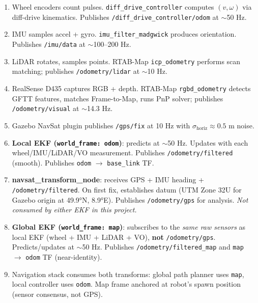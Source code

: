 \documentclass[11pt,a4paper]{article}
\begin{document}
\begin{enumerate}
\item Wheel encoders count pulses. \texttt{diff\_drive\_controller} computes $(v, \omega)$ via diff-drive kinematics. Publishes \texttt{/diff\_drive\_controller/odom} at $\sim$50 Hz.

\item IMU samples accel + gyro. \texttt{imu\_filter\_madgwick} produces orientation. Publishes \texttt{/imu/data} at $\sim$100--200 Hz.

\item LiDAR rotates, samples points. RTAB-Map \texttt{icp\_odometry} performs scan matching; publishes \texttt{/odometry/lidar} at $\sim$10 Hz.

\item RealSense D435 captures RGB + depth. RTAB-Map \texttt{rgbd\_odometry} detects GFTT features, matches Frame-to-Map, runs PnP solver; publishes \texttt{/odometry/visual} at $\sim$14.3 Hz.

\item Gazebo NavSat plugin publishes \texttt{/gps/fix} at 10 Hz with $\sigma_{\text{horiz}} \approx 0.5$ m noise.

\item \textbf{Local EKF (\texttt{world\_frame: odom})}: predicts at $\sim$50 Hz. Updates with each wheel/IMU/LiDAR/VO measurement. Publishes \texttt{/odometry/filtered} (smooth). Publishes \texttt{odom} $\to$ \texttt{base\_link} TF.

\item \textbf{navsat\_transform\_node}: receives GPS + IMU heading + \texttt{/odometry/filtered}. On first fix, establishes datum (UTM Zone 32U for Gazebo origin at 49.9°N, 8.9°E). Publishes \texttt{/odometry/gps} for analysis. \emph{Not consumed by either EKF in this project.}

\item \textbf{Global EKF (\texttt{world\_frame: map})}: subscribes to the \emph{same raw sensors} as local EKF (wheel + IMU + LiDAR + VO), \textbf{not} \texttt{/odometry/gps}. Predicts/updates at $\sim$50 Hz. Publishes \texttt{/odometry/filtered\_map} and \texttt{map} $\to$ \texttt{odom} TF (near-identity).

\item Navigation stack consumes both transforms: global path planner uses \texttt{map}, local controller uses \texttt{odom}. Map frame anchored at robot's spawn position (sensor consensus, not GPS).
\end{enumerate}
\end{document}
